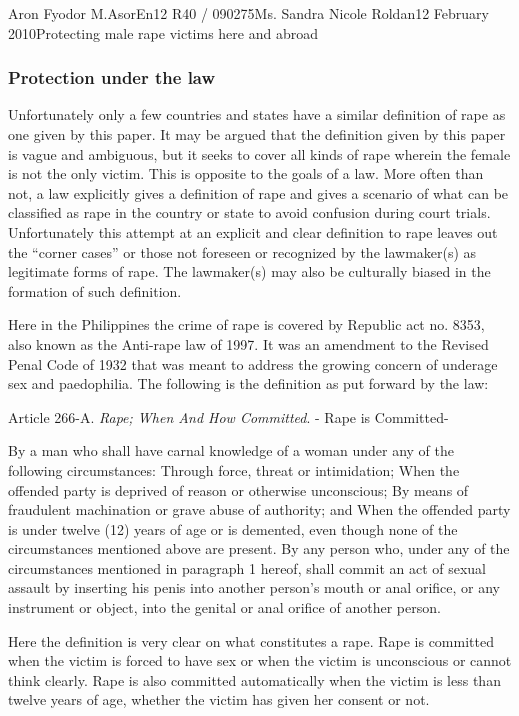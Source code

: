 \documentclass[12pt,letterpaper]{article}
\begin{document}
\begin{mla}{Aron Fyodor M.}{Asor}{En12 R40 / 090275}{Ms. Sandra Nicole Roldan}{12 February 2010}{Protecting male rape victims here and abroad}
\subsubsection{Protection under the law}
%
%
\tab Unfortunately only a few countries and states have a similar definition of rape as one given by this paper. It may be argued that the definition given by this paper is vague and ambiguous, but it seeks to cover all kinds of rape wherein the female is not the only victim. This is opposite to the goals of a law. More often than not, a law explicitly gives a definition of rape and gives a scenario of what can be classified as rape in the country or state to avoid confusion during court trials. Unfortunately this attempt at an explicit and clear definition to rape leaves out the ``corner cases'' or those not foreseen or recognized by the lawmaker(s) as legitimate forms of rape. The lawmaker(s) may also be culturally biased in the formation of such definition. 

Here in the Philippines the crime of rape is covered by Republic act no. 8353, also known as the Anti-rape law of 1997. It was an amendment to the Revised Penal Code of 1932 that was meant to address the growing concern of underage sex and paedophilia. The following is the definition as put forward by the law:

\begin{mlaquote}
	Article 266-A. \textit{Rape; When And How Committed}. - Rape is Committed-
	\begin{outline}[enumerate]
			\1 By a man who shall have carnal knowledge of a woman under any of the following circumstances:
				\2 Through force, threat or intimidation;
				\2 When the offended party is deprived of reason or otherwise unconscious;
				\2 By means of fraudulent machination or grave abuse of authority; and
				\2 When the offended party is under twelve (12) years of age or is demented, even though none of the circumstances mentioned above are present.
			\1 By any person who, under any of the circumstances mentioned in paragraph 1 hereof, shall commit an act of sexual assault by inserting his penis into another person's mouth or anal orifice, or any instrument or object, into the genital or anal orifice of another person.
	\end{outline}
\end{mlaquote}

Here the definition is very clear on what constitutes a rape. Rape is committed when the victim is forced to have sex or when the victim is unconscious or cannot think clearly. Rape is also committed automatically when the victim is less than twelve years of age, whether the victim has given her consent or not.


\end{mla}
\end{document}
